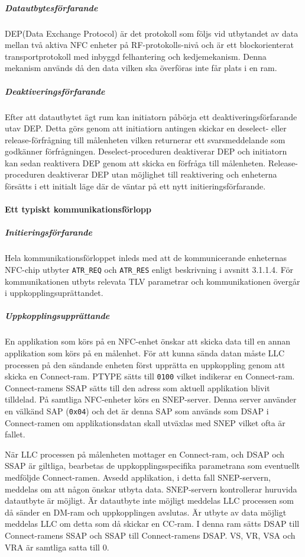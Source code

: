 \documentclass[11pt]{article}
\begin{document}

\subparagraph{Datautbytesförfarande}
DEP(Data Exchange Protocol) är det protokoll som följs vid utbytandet av data mellan två aktiva NFC enheter på RF-protokolls-nivå och är ett blockorienterat transportprotokoll med inbyggd felhantering och kedjemekanism. Denna mekanism används då den data vilken ska överföras inte får plats i en ram.

\subparagraph{Deaktiveringsförfarande}
Efter att datautbytet ägt rum kan initiatorn påbörja ett deaktiveringsförfarande utav DEP. Detta görs genom att initiatiorn antingen skickar en deselect- eller release-förfrågning till målenheten vilken returnerar ett svarsmeddelande som godkänner förfrågningen. Deselect-proceduren deaktiverar DEP och initiatorn kan sedan reaktivera DEP genom att skicka en förfråga till målenheten. Release-proceduren deaktiverar DEP utan möjlighet till reaktivering och enheterna försätts i ett initialt läge där de väntar på ett nytt initieringsförfarande.

\paragraph{Ett typiskt kommunikationsförlopp}

\subparagraph{Initieringsförfarande}
Hela kommunikationsförloppet inleds med att de kommunicerande enheternas NFC-chip utbyter \texttt{ATR\_REQ} och \texttt{ATR\_RES} enligt beskrivning i avsnitt 3.1.1.4. För kommunikationen utbyts relevata TLV parametrar och kommunikationen övergår i uppkopplingsuprättandet.

\subparagraph{Uppkopplingsupprättande}
En applikation som körs på en NFC-enhet önskar att skicka data till en annan applikation som körs på en målenhet. För att kunna sända datan måste LLC processen på den sändande enheten först upprätta en uppkoppling genom att skicka en Connect-ram. PTYPE sätts till \texttt{0100} vilket indikerar en Connect-ram. Connect-ramens SSAP sätts till den adress som aktuell applikation blivit tilldelad. På samtliga NFC-enheter körs en SNEP-server. Denna server använder en välkänd SAP (\texttt{0x04}) och det är denna SAP som används som DSAP i Connect-ramen om applikationsdatan skall utväxlas med SNEP vilket ofta är fallet. 

När LLC processen på målenheten mottager en Connect-ram, och DSAP och SSAP är giltliga, bearbetas de uppkopplingsspecifika parametrana som eventuellt medföljde Connect-ramen. Avsedd applikation, i detta fall SNEP-servern, meddelas om att någon önskar utbyta data. SNEP-servern kontrollerar huruvida datautbyte är möjligt. Är datautbyte inte möjligt meddelas LLC processen som då sänder en DM-ram och uppkopplingen avslutas. Är utbyte av data möjligt meddelas LLC om detta som då skickar en CC-ram. I denna ram sätts DSAP till Connect-ramens SSAP och SSAP till Connect-ramens DSAP. VS, VR, VSA och VRA är samtliga satta till 0.
\end{document}
